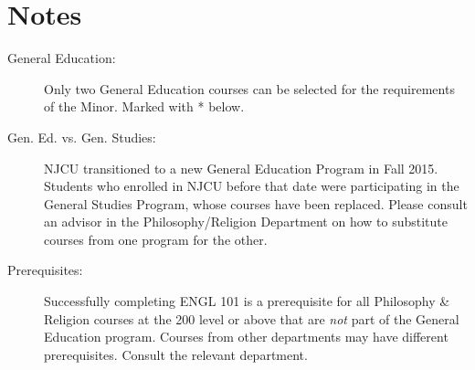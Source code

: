 \documentclass[oneside]{article}
\begin{document}
\section*{Notes}

\begin{description}
\item[General Education:] Only two General Education courses can be selected for the requirements of the Minor. Marked with * below. 
\item[Gen. Ed. vs. Gen. Studies:] NJCU transitioned to a new General Education Program in Fall 2015. Students who enrolled in NJCU before that date were participating in the General Studies Program, whose courses have been replaced. Please consult an advisor in the Philosophy/Religion Department on how to substitute courses from one program for the other.  
\item[Prerequisites:] Successfully completing ENGL 101 is a prerequisite for all Philosophy \& Religion courses at the 200 level or above that are \emph{not} part of the General Education program. Courses from other departments may have different prerequisites. Consult the relevant department. 
\end{description}
\end{document}
